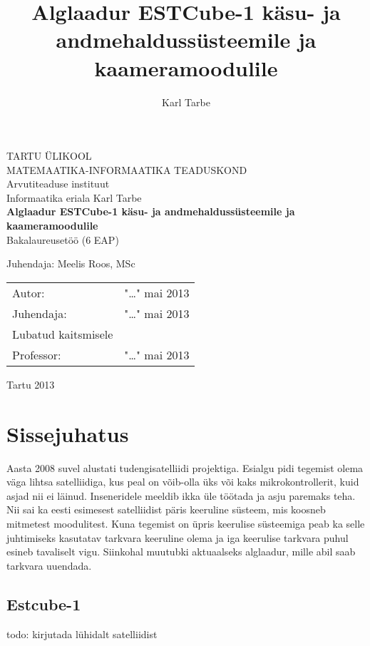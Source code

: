 \documentclass[12pt,a4paper]{article}
\title{Alglaadur ESTCube-1 käsu- ja andmehaldussüsteemile ja kaameramoodulile}
\author{Karl Tarbe}
\begin{document}
\begin{titlepage}
\begin{center}
	{\large TARTU ÜLIKOOL\\
MATEMAATIKA-INFORMAATIKA TEADUSKOND\\
Arvutiteaduse instituut\\
Informaatika eriala}
\vskip4cm
{\large Karl Tarbe}\\[6mm]
{\huge\bf Alglaadur ESTCube-1 käsu- ja andmehaldussüsteemile ja kaameramoodulile}\\[4mm]
{\large Bakalaureusetöö (6 EAP)}
\end{center}
\vspace{2cm}
\begin{flushright}
	\large
	Juhendaja: Meelis Roos, MSc
\end{flushright}
\vspace{2cm}
\begin{tabular}{l p{8cm} r}
	Autor: & \dotfill & "\dots" mai 2013\\
	Juhendaja: & \dotfill & "\dots" mai 2013\\[6mm]
	\multicolumn{2}{l}{Lubatud kaitsmisele}\\
	Professor: & \dotfill & "\dots" mai 2013\\
\end{tabular}
\vfill
\centerline{Tartu 2013}
\end{titlepage}
\setcounter{page}{2}
\tableofcontents

\glsaddall
\printglossaries

\section{Sissejuhatus}
Aasta 2008 suvel alustati tudengisatelliidi projektiga. Esialgu pidi tegemist
olema väga lihtsa satelliidiga, kus peal on võib-olla üks või kaks
mikrokontrollerit, kuid asjad nii ei läinud. Inseneridele meeldib ikka üle
töötada ja asju paremaks teha. Nii sai ka eesti esimesest satelliidist päris
keeruline süsteem, mis koosneb mitmetest moodulitest. Kuna tegemist on üpris
keerulise süsteemiga peab ka selle juhtimiseks kasutatav tarkvara keeruline
olema ja iga keerulise tarkvara puhul esineb tavaliselt vigu. Siinkohal muutubki
aktuaalseks alglaadur, mille abil saab tarkvara uuendada.

\subsection{Estcube-1}
todo: kirjutada lühidalt satelliidist
\end{document}
